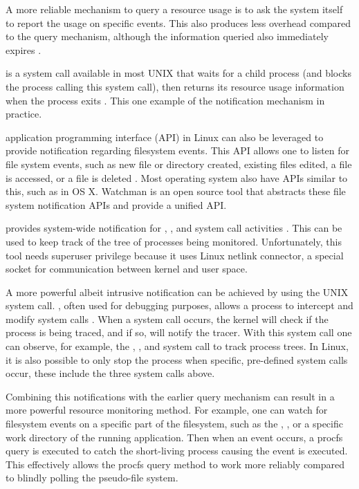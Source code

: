 A more reliable mechanism to query a resource usage is to ask the system itself to report the usage on specific events.
This also produces less overhead compared to the query mechanism, although the information queried also immediately expires \citep{juvePracticalResourceMonitoring2015}.

 is a system call available in most UNIX that waits for a child process (and blocks the process calling this system call), then returns its resource usage information when the process exits \citep{manpages}.
This one example of the notification mechanism in practice.

 application programming interface (API) in Linux can also be leveraged to provide notification regarding filesystem events.
This API allows one to listen for file system events, such as new file or directory created, existing files edited, a file is accessed, or a file is deleted \citep{manpages}.
Most operating system also have APIs similar to this, such as  in OS X. Watchman \citep{WatchesFilesRecords2019} is an open source tool that abstracts these file system notification APIs and provide a unified API.

 provides system-wide notification for , , and  system call activities \citep{UbuntuManpageForkstat}.
This can be used to keep track of the tree of processes being monitored.
Unfortunately, this tool needs superuser privilege because it uses Linux netlink connector, a special socket for communication between kernel and user space.

A more powerful albeit intrusive notification can be achieved by using the UNIX  system call.
, often used for debugging purposes, allows a process to intercept and modify system calls \citep{manpages}.
When a system call occurs, the kernel will check if the process is being traced, and if so, will notify the tracer.
With this system call one can observe, for example, the , , and  system call to track process trees.
In Linux, it is also possible to only stop the process when specific, pre-defined system calls occur, these include the three system calls above.

Combining this notifications with the earlier query mechanism can result in a more powerful resource monitoring method.
For example, one can watch for filesystem events on a specific part of the filesystem, such as the , , or a specific work directory of the running application. Then when an event occurs, a procfs query is executed to catch the short-living process causing the event is executed.
This effectively allows the procfs query method to work more reliably compared to blindly polling the pseudo-file system.

